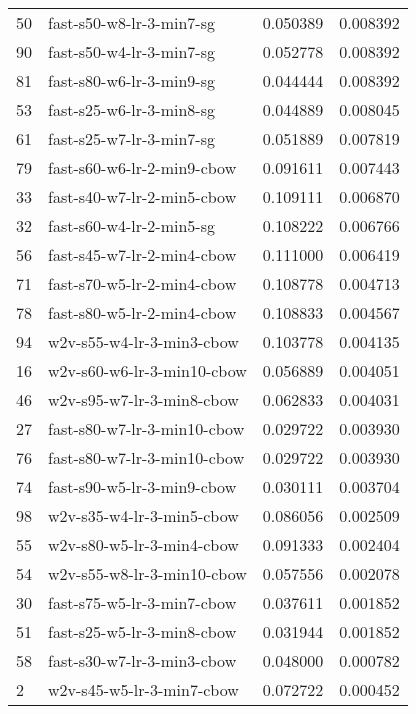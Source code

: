{\begin{tabular}{llrr}
50 &     fast-s50-w8-lr-3-min7-sg &  0.050389 &  0.008392 \\
90 &     fast-s50-w4-lr-3-min7-sg &  0.052778 &  0.008392 \\
81 &     fast-s80-w6-lr-3-min9-sg &  0.044444 &  0.008392 \\
53 &     fast-s25-w6-lr-3-min8-sg &  0.044889 &  0.008045 \\
61 &     fast-s25-w7-lr-3-min7-sg &  0.051889 &  0.007819 \\
79 &   fast-s60-w6-lr-2-min9-cbow &  0.091611 &  0.007443 \\
33 &   fast-s40-w7-lr-2-min5-cbow &  0.109111 &  0.006870 \\
32 &     fast-s60-w4-lr-2-min5-sg &  0.108222 &  0.006766 \\
56 &   fast-s45-w7-lr-2-min4-cbow &  0.111000 &  0.006419 \\
71 &   fast-s70-w5-lr-2-min4-cbow &  0.108778 &  0.004713 \\
78 &   fast-s80-w5-lr-2-min4-cbow &  0.108833 &  0.004567 \\
94 &    w2v-s55-w4-lr-3-min3-cbow &  0.103778 &  0.004135 \\
16 &   w2v-s60-w6-lr-3-min10-cbow &  0.056889 &  0.004051 \\
46 &    w2v-s95-w7-lr-3-min8-cbow &  0.062833 &  0.004031 \\
27 &  fast-s80-w7-lr-3-min10-cbow &  0.029722 &  0.003930 \\
76 &  fast-s80-w7-lr-3-min10-cbow &  0.029722 &  0.003930 \\
74 &   fast-s90-w5-lr-3-min9-cbow &  0.030111 &  0.003704 \\
98 &    w2v-s35-w4-lr-3-min5-cbow &  0.086056 &  0.002509 \\
55 &    w2v-s80-w5-lr-3-min4-cbow &  0.091333 &  0.002404 \\
54 &   w2v-s55-w8-lr-3-min10-cbow &  0.057556 &  0.002078 \\
30 &   fast-s75-w5-lr-3-min7-cbow &  0.037611 &  0.001852 \\
51 &   fast-s25-w5-lr-3-min8-cbow &  0.031944 &  0.001852 \\
58 &   fast-s30-w7-lr-3-min3-cbow &  0.048000 &  0.000782 \\
2  &    w2v-s45-w5-lr-3-min7-cbow &  0.072722 &  0.000452 \\
\bottomrule
\end{tabular}
}
